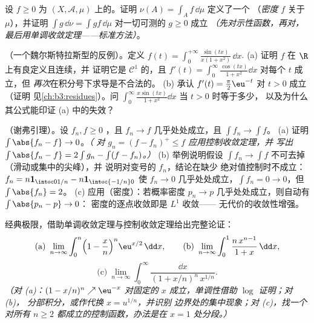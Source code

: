 \begin{exercise}[$\star\star$]\label{exo:b3:lebesgue:9}
设 $f \geq 0$ 为 $(X, \mathcal A, \mu)$ 上的。证明
$\nu(A) = \int_A f\,\dd\mu$ 定义了一个
（\emph{密度} $f$ 关于
$\mu$），并证明 $\int g\,\dd\nu = \int gf\,\dd\mu$
对一切可测的 $g \geq 0$ 成立 \emph{（先对示性函数，再对，
最后用单调收敛定理——标准方法）}。
\end{exercise}

\begin{exercise}[$\star\star\star$]\label{exo:b3:lebesgue:10}
（一个魏尔斯特拉斯型的反例）。定义 $f(t) =
\int_0^{+\infty}\frac{\sin(tx)}{x(1 + x^2)}\,\dd x$.
(a) 证明 $f$ 在 $\R$ 上有良定义且连续，并
证明它是 $\mathcal C^1$ 的，且 $f'(t) = \int_0^\infty\frac{\cos(tx)}{1 +
x^2}\dd x$ 对每个 $t$ 成立，但
\emph{再次}在积分号下求导是不合法的。
(b) 承认 $f'(t) = \frac\pi2\eu^{-t}$ 对 $t > 0$ 成立（证明
见\cref{ch:b3:residues}）。问
$\int_0^\infty\frac{x\sin(tx)}{1+x^2}\dd x$ 当 $t > 0$ 时等于多少，
以及为什么其公式能印证 (a) 中的失效？
\end{exercise}

\begin{exercise}[$\star\star$]\label{exo:b3:lebesgue:11}
（谢弗引理）。设 $f_n, f \geq 0$ ，且
$f_n \to f$ 几乎处处成立，且 $\int f_n \to \int f$。
(a) 证明 $\int\abs{f_n - f} \to 0$。\emph{（
对 $g_n = (f - f_n)^+ \leq f$ 应用控制收敛定理，并
写出 $\int\abs{f_n - f} = 2\int g_n - \int(f - f_n)$。）}
(b) 举例说明假设 $\int f_n \to \int
f$ 不可去掉（滑动或集中的尖峰），并
说明对变号的 $f_n$，结论在缺少
绝对值控制时不成立：$f_n = n\mathbf 1_{\intoc0{1/n}} -
n\mathbf 1_{\intoc{-1/n}0}$ 使 $f_n \to 0$ 几乎处处成立，$\int f_n
= 0 \to 0$，但 $\int\abs{f_n} = 2$。
(c) 应用（密度）：若概率密度 $p_n
\to p$ 几乎处处成立，则自动有 $\int\abs{p_n - p} \to 0$：
密度的逐点收敛即是 $L^1$ 收敛——
无代价的收敛性增强。
\end{exercise}

\begin{exercise}[$\star\star$]\label{exo:b3:lebesgue:12}
经典极限，借助单调收敛定理与控制收敛定理给出完整论证：
\[
\text{(a)}\ \lim_{n\to\infty}\int_0^n\Bigl(1 -
\frac xn\Bigr)^n\eu^{x/2}\,\dd x, \qquad
\text{(b)}\ \lim_{n\to\infty}\int_0^1\frac{n\,x^{n-1}}{1 +
x}\,\dd x,
\]
\[
\text{(c)}\ \lim_{n\to\infty}\int_0^\infty
\frac{\dd x}{(1 + x/n)^n\,x^{1/n}} .
\]
\emph{（对 (a)：$(1 - x/n)^n \nearrow \eu^{-x}$ 对固定的
$x$ 成立，单调性借助 $\log$ 证明；对 (b)，
分部积分，或作代换 $x = u^{1/n}$，并识别
边界处的集中现象；对 (c)，找一个
对所有 $n \geq 2$ 都成立的控制函数，办法是在 $x =
1$ 处分段。）}
\end{exercise}

